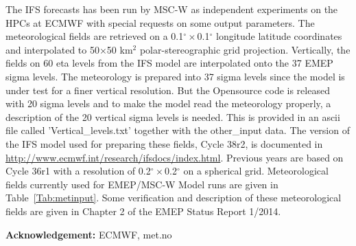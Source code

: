 The IFS forecasts has been run by MSC-W as
independent experiments on the HPCs at ECMWF with special requests on
some output parameters. The meteorological fields are retrieved on a
0.1$^{\circ}\times$0.1$^{\circ}$ longitude latitude coordinates and interpolated to
50$\times$50 km$^2$ polar-stereographic grid projection. Vertically, the fields
on 60 eta levels from the IFS model are interpolated onto the 37 EMEP sigma
levels.  The meteorology is prepared into 37 sigma levels since the model is 
under test for a finer vertical resolution.  But the Opensource code is released
with 20 sigma levels and to make the model read the meteorology properly, 
a description of the 20 vertical sigma levels is needed.  This is provided in 
an ascii file called 'Vertical\_levels.txt' together with the other\_input data. 
The version of the IFS model used for preparing these fields,
Cycle 38r2, is documented in \url{http://www.ecmwf.int/research/ifsdocs/index.html}. Previous years are based on Cycle 36r1 with a resolution of 0.2$^{\circ}\times$0.2$^{\circ}$ on a spherical grid. 
Meteorological fields currently used for EMEP/MSC-W Model runs are given in
Table~\ref{Tab:metinput}. Some verification and description of these
meteorological fields are given in Chapter 2 of the EMEP Status Report
1/2014.

{\bf Acknowledgement:} ECMWF, met.no

